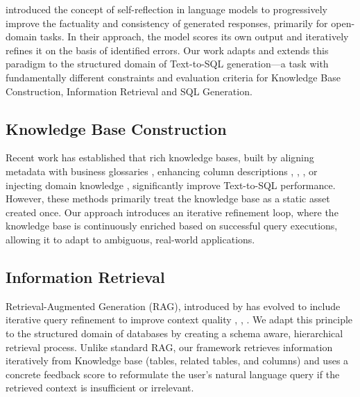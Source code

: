 \documentclass[runningheads]{llncs}
\begin{document}
\cite{ji2023towards} introduced the concept of self-reflection in language models to progressively improve the factuality and consistency of generated responses, primarily for open-domain tasks. In their approach, the model scores its own output and iteratively refines it on the basis of identified errors. Our work adapts and extends this paradigm to the structured domain of Text-to-SQL generation—a task with fundamentally different constraints and evaluation criteria for Knowledge Base Construction, Information Retrieval and SQL Generation.

\subsection{Knowledge Base Construction}

Recent work has established that rich knowledge bases, built by aligning metadata with business glossaries \cite{lobo2023matching}, enhancing column descriptions \cite{gao2025automatic}, \cite{qin2024relational}, \cite{wretblad2024synthetic}, or injecting domain knowledge \cite{ma2024enhancing}, significantly improve Text-to-SQL performance. However, these methods primarily treat the knowledge base as a static asset created once. Our approach introduces an iterative refinement loop, where the knowledge base is continuously enriched based on successful query executions, allowing it to adapt to ambiguous, real-world applications.

\subsection{Information Retrieval}

Retrieval-Augmented Generation (RAG), introduced by \cite{lewis2020retrieval} has evolved to include iterative query refinement to improve context quality \cite{asai2023self}, \cite{chan2024rq}, \cite{zhou2025openrag}. We adapt this principle to the structured domain of databases by creating a schema aware, hierarchical retrieval process. Unlike standard RAG, our framework retrieves information iteratively from Knowledge base (tables, related tables, and columns) and uses a concrete feedback score to reformulate the user's natural language query if the retrieved context is insufficient or irrelevant.
\end{document}
